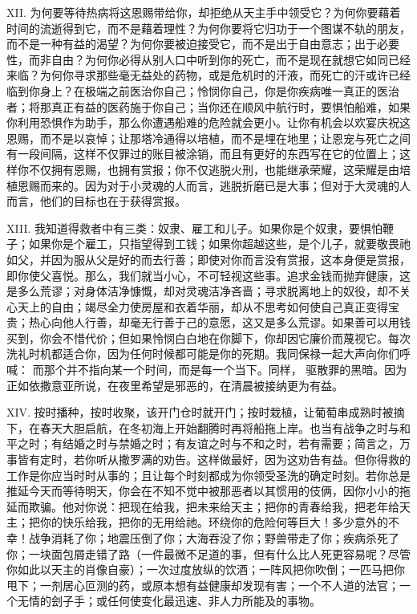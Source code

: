 XII. 为何要等待热病将这恩赐带给你，却拒绝从天主手中领受它？为何你要藉着时间的流逝得到它，而不是藉着理性？为何你要将它归功于一个图谋不轨的朋友，而不是一种有益的渴望？为何你要被迫接受它，而不是出于自由意志；出于必要性，而非自由？为何你必得从别人口中听到你的死亡，而不是现在就想它如同已经来临？为何你寻求那些毫无益处的药物，或是危机时的汗液，而死亡的汗或许已经临到你身上？在极端之前医治你自己；怜悯你自己，你是你疾病唯一真正的医治者；将那真正有益的医药施于你自己；当你还在顺风中航行时，要惧怕船难，如果你利用恐惧作为助手，那么你遭遇船难的危险就会更小。让你有机会以欢宴庆祝这恩赐，而不是以哀悼；让那塔冷通得以培植，而不是埋在地里；让恩宠与死亡之间有一段间隔，这样不仅罪过的账目被涂销，而且有更好的东西写在它的位置上；这样你不仅拥有恩赐，也拥有赏报；你不仅逃脱火刑，也能继承荣耀，这荣耀是由培植恩赐而来的。因为对于小灵魂的人而言，逃脱折磨已是大事；但对于大灵魂的人而言，他们的目标也在于获得赏报。\par

XIII. 我知道得救者中有三类：奴隶、雇工和儿子。如果你是个奴隶，要惧怕鞭子；如果你是个雇工，只指望得到工钱；如果你超越这些，是个儿子，就要敬畏祂如父，并因为服从父是好的而去行善；即使对你而言没有赏报，这本身便是赏报，即你使父喜悦。那么，我们就当小心，不可轻视这些事。追求金钱而抛弃健康，这是多么荒谬；对身体洁净慷慨，却对灵魂洁净吝啬；寻求脱离地上的奴役，却不关心天上的自由；竭尽全力使房屋和衣着华丽，却从不思考如何使自己真正变得宝贵；热心向他人行善，却毫无行善于己的意愿，这又是多么荒谬。如果善可以用钱买到，你会不惜代价；但如果怜悯白白地在你脚下，你却因它廉价而蔑视它。每次洗礼时机都适合你，因为任何时候都可能是你的死期。我同保禄一起大声向你们呼喊：  而那个并不指向某一个时间，而是每一个当下。同样，  驱散罪的黑暗。因为正如依撒意亚所说，在夜里希望是邪恶的，在清晨被接纳更为有益。\par

XIV. 按时播种，按时收聚，该开门仓时就开门；按时栽植，让葡萄串成熟时被摘下，在春天大胆启航，在冬初海上开始翻腾时再将船拖上岸。也当有战争之时与和平之时；有结婚之时与禁婚之时；有友谊之时与不和之时，若有需要；简言之，万事皆有定时，若你听从撒罗满的劝告。这样做最好，因为这劝告有益。但你得救的工作是你应当时时从事的；且让每个时刻都成为你领受圣洗的确定时刻。若你总是推延今天而等待明天，你会在不知不觉中被那恶者以其惯用的伎俩，因你小小的拖延而欺骗。他对你说：把现在给我，把未来给天主；把你的青春给我，把老年给天主；把你的快乐给我，把你的无用给祂。环绕你的危险何等巨大！多少意外的不幸！战争消耗了你；地震压倒了你；大海吞没了你；野兽带走了你；疾病杀死了你；一块面包屑走错了路（一件最微不足道的事，但有什么比人死更容易呢？尽管你如此以天主的肖像自豪）；一次过度放纵的饮酒；一阵风把你吹倒；一匹马把你甩下；一剂居心叵测的药，或原本想有益健康却发现有害；一个不人道的法官；一个无情的刽子手；或任何使变化最迅速、非人力所能及的事物。\par


